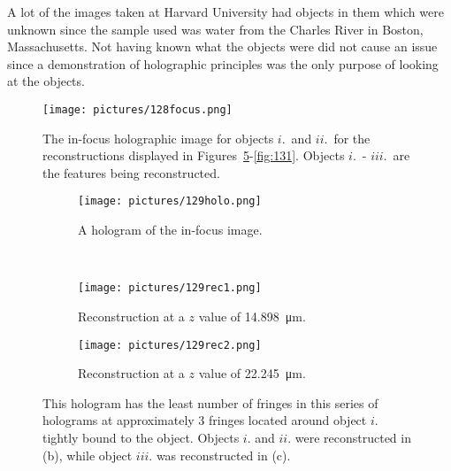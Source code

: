 A lot of the images taken at Harvard University had objects in them which were
unknown since the sample used was water from the Charles River in Boston,
Massachusetts. Not
having known what the objects were did not cause an issue since
a demonstration of holographic principles was the only purpose of looking at the objects.


\begin{figure}
    \begin{center}
        \texttt{[image: pictures/128focus.png]}
        \caption{The in-focus holographic image for objects $i.$\ and  $ii.$\
            for the reconstructions
            displayed in Figures~\ref{fig:129}-\ref{fig:131}.
    Objects $i.$\ - $iii.$\ are the features being reconstructed. }
        \label{fig:128focus}
    \end{center}
\end{figure}


\begin{figure}[ht!]
    \begin{center}

        \begin{subfigure}[t]{0.4\textwidth}
            \label{fig:129holo}
            \texttt{[image: pictures/129holo.png]}
            \caption{A hologram of the in-focus image.}
        \end{subfigure}
        \\
        \begin{subfigure}[t]{0.4\textwidth}
            \label{fig:129rec1}
            \texttt{[image: pictures/129rec1.png]}
            \caption{Reconstruction at a $z$ value of \SI{14.898}{\micro\meter}.}
        \end{subfigure}
                \hspace*{\fill}
%
        \begin{subfigure}[t]{0.4\textwidth}
            \label{fig:129rec2}
            \texttt{[image: pictures/129rec2.png]}
            \caption{Reconstruction at a $z$ value of \SI{22.245}{\micro\meter}.}
        \end{subfigure}


    \end{center}
    \caption{%
        This hologram has the least number of fringes in this series of
        holograms at approximately 3 fringes located around object $i.$ tightly
        bound to the object. 
        Objects $i.$ and $ii.$ were reconstructed in (b),
        while object $iii.$ was reconstructed in (c).
    }%
    \label{fig:129}
\end{figure}


